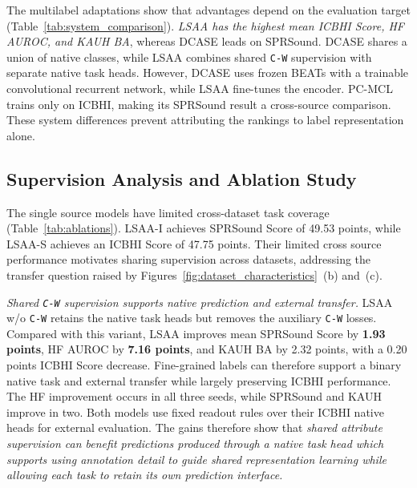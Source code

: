 \LSAAMainResultsTable
\vspace{2mm}
The multilabel adaptations show that advantages depend on the evaluation target (Table~\ref{tab:system_comparison}). \emph{LSAA has the highest mean ICBHI Score, HF AUROC, and KAUH BA}, whereas DCASE leads on SPRSound. DCASE shares a union of native classes, while LSAA combines shared \texttt{C-W} supervision with separate native task heads. However, DCASE uses frozen BEATs with a trainable convolutional recurrent network, while LSAA fine-tunes the encoder. PC-MCL trains only on ICBHI, making its SPRSound result a cross-source comparison. These system differences prevent attributing the rankings to label representation alone.

\LSAASystemComparisonTable
\subsection{Supervision Analysis and Ablation Study}
\label{sec:ablations}
\label{sec:transfer}
\vspace{2mm}

The single source models have limited cross-dataset task coverage (Table~\ref{tab:ablations}). LSAA-I achieves SPRSound Score of 49.53 points, while LSAA-S achieves an ICBHI Score of 47.75 points. Their limited cross source performance motivates sharing supervision across datasets, addressing the transfer question raised by Figures~\ref{fig:dataset_characteristics}~(b) and~(c).

\LSAAAnalysisTable
\vspace{2mm}
\label{sec:fine_supervision}
\label{sec:readout_analysis}
\emph{Shared \texttt{C-W} supervision supports native prediction and external transfer. }LSAA w/o \texttt{C-W} retains the native task heads but removes the auxiliary \texttt{C-W} losses. Compared with this variant, LSAA improves mean SPRSound Score by \textbf{1.93 points}, HF AUROC by \textbf{7.16 points}, and KAUH BA by 2.32 points, with a 0.20 points ICBHI Score decrease. Fine-grained labels can therefore support a binary native task and external transfer while largely preserving ICBHI performance. The HF improvement occurs in all three seeds, while SPRSound and KAUH improve in two. Both models use fixed readout rules over their ICBHI native heads for external evaluation. The gains therefore show that \emph{shared attribute supervision can benefit predictions produced through a native task head which supports using annotation detail to guide shared representation learning while allowing each task to retain its own prediction interface.}

